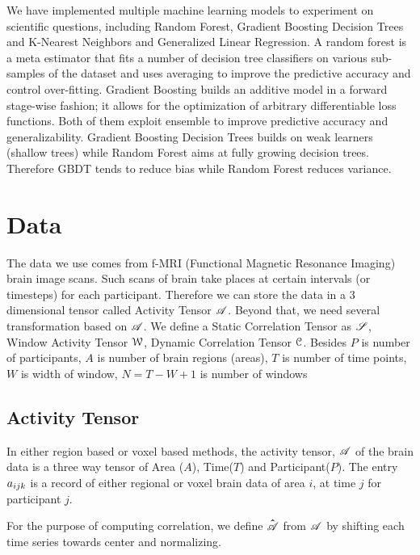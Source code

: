 \documentclass{article}[12pt]
\newcommand{\T}[2][]{\boldsymbol{#1\mathscr{\MakeUppercase{#2}}}}
\newcommand{\TE}[3][]{#1{\MakeLowercase{#2}}_{#3}}
\begin{document}
We have implemented multiple machine learning models to experiment on scientific questions, including Random Forest, Gradient Boosting Decision Trees and K-Nearest Neighbors and Generalized Linear Regression. A random forest \cite{RF} is a meta estimator that fits a number of decision tree classifiers on various sub-samples of the dataset and uses averaging to improve the predictive accuracy and control over-fitting. Gradient Boosting \cite{GBDT} builds an additive model in a forward stage-wise fashion; it allows for the optimization of arbitrary differentiable loss functions. Both of them exploit ensemble to improve predictive accuracy and generalizability. Gradient Boosting Decision Trees builds on weak learners (shallow trees) while Random Forest aims at fully growing decision trees. Therefore GBDT tends to reduce bias while Random Forest reduces variance. 




\section{Data}
The data we use comes from f-MRI (Functional Magnetic Resonance Imaging) brain image scans. Such scans of brain take places at certain intervals (or timesteps) for each participant. Therefore we can store the data in a 3 dimensional tensor called Activity Tensor $\T{A}$.  Beyond that, we need several transformation based on $\T{A}$. We define a Static Correlation Tensor as $\T{S}$, Window Activity Tensor $\cal W$, Dynamic Correlation Tensor $\cal C$. Besides $P$ is number of participants, $A$ is number of brain regions (areas), $T$ is number of time points, $W$ is width of window, $N=T-W+1$ is number of windows

	
\subsection{Activity Tensor}
In either region based or voxel based methods, the activity tensor, ${\T A}$ of the brain data is a three way tensor of Area ($A$), Time($T$) and Participant($P$). The entry $\TE{A}{ijk}$  is a record of either regional or voxel brain data of area $i$,  at time $j$ for participant $j$.


\begin{center}
\end{center}
For the purpose of computing correlation, we define ${\T[\hat]{A}}$ from $\T{A}$ by shifting each time series towards center and normalizing.
\end{document}
